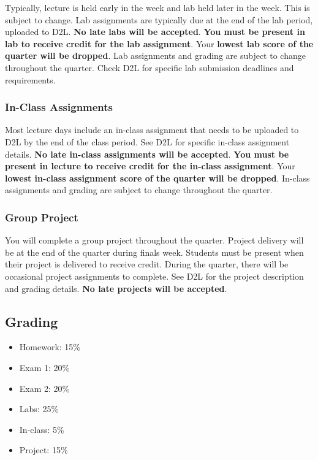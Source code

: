 \documentclass[11pt]{article}
\providecommand{\tightlist}{%
      \setlength{\itemsep}{0pt}\setlength{\parskip}{0pt}}
\begin{document}
Typically, lecture is held early in the week and lab held later in the
week. This is subject to change. Lab assignments are typically due at
the end of the lab period, uploaded to D2L. \textbf{No late labs will be
accepted}. \textbf{You must be present in lab to receive credit for the
lab assignment}. Your \textbf{lowest lab score of the quarter will be
dropped}. Lab assignments and grading are subject to change throughout
the quarter. Check D2L for specific lab submission deadlines and
requirements.

    \hypertarget{in-class-assignments}{%
\subsubsection{In-Class Assignments}\label{in-class-assignments}}

Most lecture days include an in-class assignment that needs to be
uploaded to D2L by the end of the class period. See D2L for specific
in-class assignment details. \textbf{No late in-class assignments will
be accepted}. \textbf{You must be present in lecture to receive credit
for the in-class assignment}. Your \textbf{lowest in-class assignment
score of the quarter will be dropped}. In-class assignments and grading
are subject to change throughout the quarter.

    \hypertarget{group-project}{%
\subsubsection{Group Project}\label{group-project}}

You will complete a group project throughout the quarter. Project
delivery will be at the end of the quarter during finals week. Students
must be present when their project is delivered to receive credit.
During the quarter, there will be occasional project assignments to
complete. See D2L for the project description and grading details.
\textbf{No late projects will be accepted}.

    \hypertarget{grading}{%
\subsection{Grading}\label{grading}}

\begin{itemize}
\tightlist
\item
  Homework: 15\%
\item
  Exam 1: 20\%
\item
  Exam 2: 20\%
\item
  Labs: 25\%
\item
  In-class: 5\%
\item
  Project: 15\%
\end{itemize}
\end{document}
